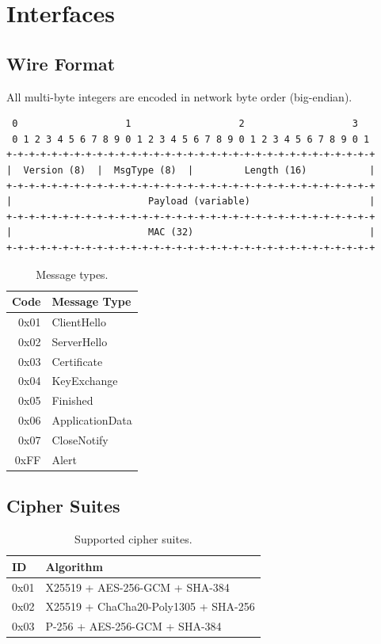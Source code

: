\documentclass[
    language=english,
    doctype=article,
    institution=none,
]{../../omnilatex}
\begin{document}
\section{Interfaces}

\subsection{Wire Format}

All multi-byte integers are encoded in network byte order (big-endian).

\begin{verbatim}
 0                   1                   2                   3
 0 1 2 3 4 5 6 7 8 9 0 1 2 3 4 5 6 7 8 9 0 1 2 3 4 5 6 7 8 9 0 1
+-+-+-+-+-+-+-+-+-+-+-+-+-+-+-+-+-+-+-+-+-+-+-+-+-+-+-+-+-+-+-+-+
|  Version (8)  |  MsgType (8)  |         Length (16)           |
+-+-+-+-+-+-+-+-+-+-+-+-+-+-+-+-+-+-+-+-+-+-+-+-+-+-+-+-+-+-+-+-+
|                        Payload (variable)                     |
+-+-+-+-+-+-+-+-+-+-+-+-+-+-+-+-+-+-+-+-+-+-+-+-+-+-+-+-+-+-+-+-+
|                        MAC (32)                               |
+-+-+-+-+-+-+-+-+-+-+-+-+-+-+-+-+-+-+-+-+-+-+-+-+-+-+-+-+-+-+-+-+
\end{verbatim}

\begin{table}[htbp]
    \centering
    \caption{Message types.}
    \label{tab:msgtypes}
    \begin{tabular}{@{}rl@{}}
        \toprule
        \textbf{Code} & \textbf{Message Type} \\
        \midrule
        0x01 & ClientHello \\
        0x02 & ServerHello \\
        0x03 & Certificate \\
        0x04 & KeyExchange \\
        0x05 & Finished \\
        0x06 & ApplicationData \\
        0x07 & CloseNotify \\
        0xFF & Alert \\
        \bottomrule
    \end{tabular}
\end{table}

\subsection{Cipher Suites}

\begin{table}[htbp]
    \centering
    \caption{Supported cipher suites.}
    \label{tab:ciphers}
    \begin{tabular}{@{}ll@{}}
        \toprule
        \textbf{ID} & \textbf{Algorithm} \\
        \midrule
        0x01 & X25519 + AES-256-GCM + SHA-384 \\
        0x02 & X25519 + ChaCha20-Poly1305 + SHA-256 \\
        0x03 & P-256 + AES-256-GCM + SHA-384 \\
        \bottomrule
    \end{tabular}
\end{table}
\end{document}
